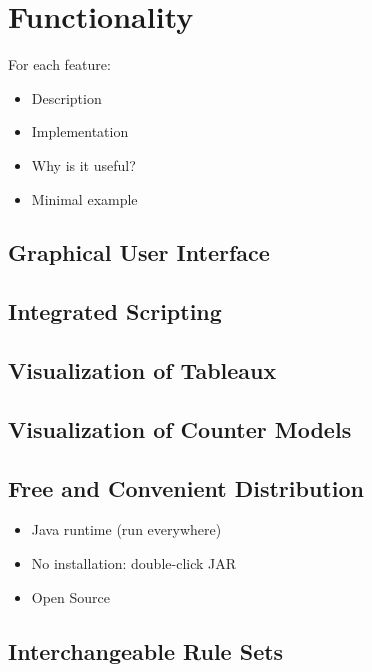 \section{Functionality}
\label{sec:features}

For each feature:
\begin{itemize}
\item{Description}
\item{Implementation}
\item{Why is it useful?}
\item{Minimal example}
\end{itemize}

\subsection{Graphical User Interface}

\subsection{Integrated Scripting}

\subsection{Visualization of Tableaux}

\subsection{Visualization of Counter Models}

\subsection{Free and Convenient Distribution}

\begin{itemize}
\item Java runtime (run everywhere)
\item No installation: double-click JAR
\item Open Source
\end{itemize}

\subsection{Interchangeable Rule Sets}

